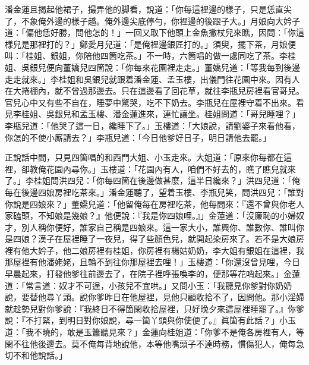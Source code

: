 潘金蓮且揭起他裙子，撮弄他的脚看，說道：「你每這裡邊的樣子，只是恁直尖了，不象俺外邊的樣子趫。俺外邊尖底停勻，你裡邊的後跟子大。」{}月娘向大妗子道：「偏他恁好勝，問他怎的！」一回又取下他頭上金魚撇杖兒來瞧，因問：「你這樣兒是那裡打的？」鄭愛月兒道：「是俺裡邊銀匠打的。」須臾，擺下茶，月娘便叫：「桂姐、銀姐，你陪他四箇吃茶。」不一時，六箇唱的做一處同吃了茶。李桂姐、吳銀兒便向董嬌兒四箇說：「你每來花園裡走走。」董嬌兒道：「等我每到後邊走走就來。」{}李桂姐和吳銀兒就跟着潘金蓮、孟玉樓，出儀門往花園中來。因有人在大捲棚內，就不曾過那邊去。只在這邊看了回花草，就往李瓶兒房裡看官哥兒。官兒心中又有些不自在，睡夢中驚哭，吃不下奶去。李瓶兒在屋裡守着不出來。看見李桂姐、吳銀兒和孟玉樓、潘金蓮進來，連忙讓坐。桂姐問道：「哥兒睡哩？」李瓶兒道：「他哭了這一日，纔睡下了。」玉樓道：「大娘說，請劉婆子來看他看，你怎的不使小厮請去？」李瓶兒道：「今日他爹好日子，明日請他去罷。」

正說話中間，只見四箇唱的和西門大姐、小玉走來。大姐道：「原來你每都在這裡，卻教俺花園內尋你。」玉樓道：「花園內有人，咱們不好去的，瞧了瞧兒就來了。」李桂姐問洪四兒：「你每四箇在後邊做甚麼，這半日纔來？」洪四兒道：「俺每在後邊四娘房裡吃茶來。」潘金蓮聽了，望着玉樓、李瓶兒笑，問洪四兒：「誰對你說是四娘來？」董嬌兒道：「他留俺每在房裡吃茶，他每問來：『還不曾與你老人家磕頭，不知娘是幾娘？』他便說：『我是你四娘哩。』」金蓮道：「沒廉恥的小婦奴才，別人稱你便好，誰家自己稱是四娘來。這一家大小，誰興你、誰數你、誰叫你是四娘？漢子在屋裡睡了一夜兒，得了些顏色兒，就開起染房來了。若不是大娘房裡有他大妗子，他二娘房裡有桂姐，你房裡有楊姑奶奶，李大姐有銀姐在這裡，我那屋裡有他潘姥姥，且輪不到往你那屋裡去哩！」{}{}玉樓道：「你還沒曾見哩，今日早晨起來，打發他爹往前邊去了，在院子裡呼張喚李的，便那等花哨起來。」金蓮道：「常言道：奴才不可逞，小孩兒不宜哄。」{}又問小玉：「我聽見你爹對你奶奶說，要替他尋丫頭。說你爹昨日在他屋裡，見他只顧收拾不了，因問他。那小淫婦就趁勢兒對你爹說：『我終日不得箇閑收拾屋裡，只好晚夕來這屋裡睡罷了。』你爹說：『不打緊，到明日對你娘說，尋一箇丫頭與你使便了。』眞箇有此話？」{}小玉道：「我不曉的，敢是玉簫聽見來？」金蓮向桂姐道：「你爹不是俺各房裡有人，等閑不往他後邊去。莫不俺每背地說他，本等他嘴頭子不達時務，慣傷犯人，俺每急切不和他說話。」{}

